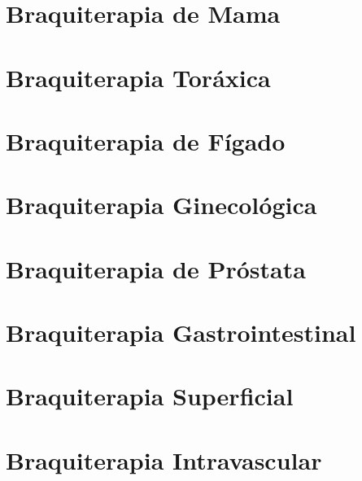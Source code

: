 \documentclass[11pt,a4paper]{article}
\begin{document}
    \section{Braquiterapia de Mama}

    \section{Braquiterapia Toráxica}

    \section{Braquiterapia de Fígado}

    \section{Braquiterapia Ginecológica}
    
    \section{Braquiterapia de Próstata}

    \section{Braquiterapia Gastrointestinal}

    \section{Braquiterapia Superficial}

    \section{Braquiterapia Intravascular}




\end{document}

